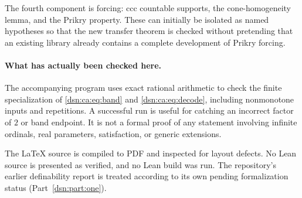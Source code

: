 \documentclass[11pt,a4paper]{article}
\numberwithin{equation}{section}
\theoremstyle{definition}
\theoremstyle{remark}
\begin{document}
The fourth component is forcing: ccc countable supports, the
cone-homogeneity lemma, and the Prikry property. These can initially
be isolated as named hypotheses so that the new transfer theorem is
checked without pretending that an existing library already contains
a complete development of Prikry forcing.
\paragraph{What has actually been checked here.}
The accompanying program uses exact rational arithmetic to check the
finite specialization of \eqref{dsn:ca:eq:band} and \eqref{dsn:ca:eq:decode}, including
nonmonotone inputs and repetitions. A successful run is useful for
catching an incorrect factor of $2$ or band endpoint. It is not a
formal proof of any statement involving infinite ordinals, real
parameters, satisfaction, or generic extensions.

The LaTeX source is compiled to PDF and inspected for layout defects.
No Lean source is presented as verified, and no Lean build was run.
The repository's earlier definability report is treated according to
its own pending formalization status (Part~\ref{dsn:part:one}).
\end{document}
